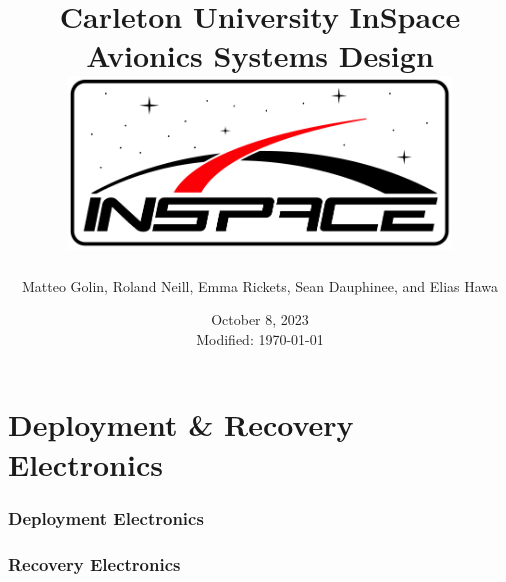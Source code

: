\documentclass[11pt, draft]{article}
\title{
    Carleton University InSpace Avionics Systems Design \\
    \vspace{0.2in}
    \includegraphics[width=4in]{./assets/images/inspace-logo.png}
}
\author{Matteo Golin, Roland Neill, Emma Rickets, Sean Dauphinee, and Elias Hawa}
\date{
    October 8, 2023 \\
    Modified: \today
}
\begin{document}
\maketitle
\pagebreak

{
    \hypersetup{hidelinks}
    \tableofcontents
    \listoffigures
}
\pagebreak











\part{Deployment \& Recovery Electronics}
\section{Deployment Electronics}

\section{Recovery Electronics}



\pagebreak
\printglossary[title={Glossary}]
\printglossary[type=\acronymtype,title={Acronyms}]


\pagebreak
\printbibliography


\pagebreak

\end{document}
